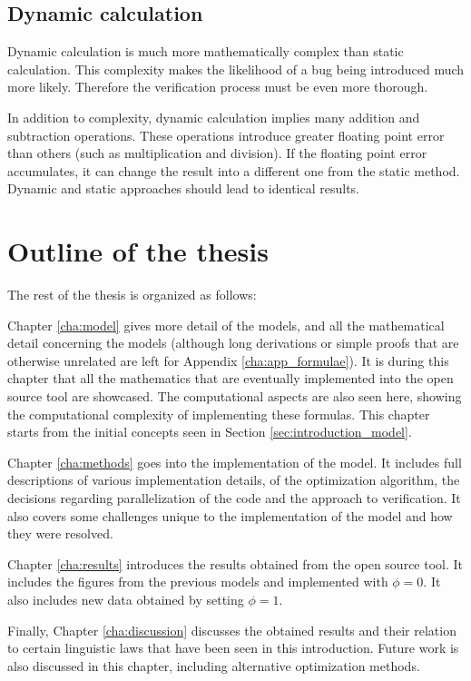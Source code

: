 \subsection{Dynamic calculation}
\label{sec:introduction_challenges_dynamic}

Dynamic calculation is much more mathematically complex than static calculation.
This complexity makes the likelihood of a bug being introduced much more likely.
Therefore the verification process must be even more thorough.

In addition to complexity, dynamic calculation implies many addition and subtraction operations.
These operations introduce greater floating point error than others (such as multiplication and division).
If the floating point error accumulates, it can change the result into a different one from the static method.
Dynamic and static approaches should lead to identical results.

\section{Outline of the thesis}
\label{sec:introduction_outline}

The rest of the thesis is organized as follows:

Chapter \ref{cha:model} gives more detail of the models, and all the mathematical detail concerning the models (although long derivations or simple proofs that are otherwise unrelated are left for Appendix \ref{cha:app_formulae}).
It is during this chapter that all the mathematics that are eventually implemented into the open source tool are showcased.
The computational aspects are also seen here, showing the computational complexity of implementing these formulas.
This chapter starts from the initial concepts seen in Section \ref{sec:introduction_model}.

Chapter \ref{cha:methods} goes into the implementation of the model.
It includes full descriptions of various implementation details, of the optimization algorithm, the decisions regarding parallelization of the code and the approach to verification.
It also covers some challenges unique to the implementation of the model and how they were resolved.

Chapter \ref{cha:results} introduces the results obtained from the open source tool.
It includes the figures from the previous models \cite{Ferrer2005a} and \cite{Ferrer2003a} implemented with $\phi=0$.
It also includes new data obtained by setting $\phi=1$.

Finally, Chapter \ref{cha:discussion} discusses the obtained results and their relation to certain linguistic laws that have been seen in this introduction.
Future work is also discussed in this chapter, including alternative optimization methods.

